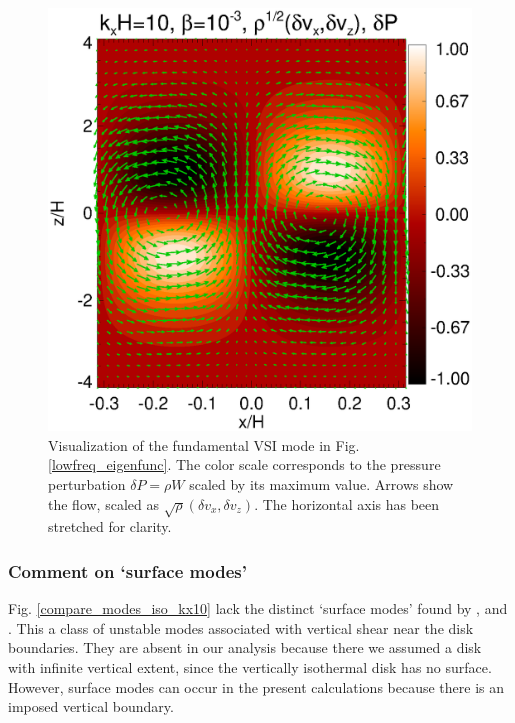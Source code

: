 \begin{figure}
  \includegraphics[width=\linewidth]{figures/result2d_iso}
  \caption{Visualization of the fundamental VSI mode in
    Fig. \ref{lowfreq_eigenfunc}. The color scale corresponds to the
    pressure perturbation $\delta P=\rho W$ scaled by its maximum value.
    Arrows show the flow, scaled as $\sqrt{\rho}(\delta
    v_x,\delta v_z)$. The horizontal axis has been stretched 
    for clarity.  
    \label{lowfreq_eigenfunc_2d}
  }
\end{figure}

\subsubsection{Comment on `surface modes'}\label{surf_comment} 
Fig. \ref{compare_modes_iso_kx10} lack the distinct `surface modes' found by 
,   and . 
This a class of unstable modes associated with vertical shear near the
disk boundaries. They are absent in our  
analysis because there we assumed a disk with infinite 
vertical extent, since the vertically isothermal disk has no
surface. However, surface modes can occur in the present calculations 
because there is an imposed vertical boundary.   

